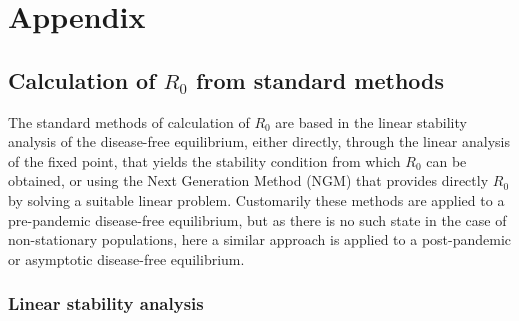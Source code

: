\section{Appendix}

\subsection{Calculation of $R_0$ from standard
    methods}\label{app:R0_standar_methods}

The standard methods of calculation of $R_0$ are based in the linear
stability analysis of the disease-free equilibrium, either directly, through
the linear analysis of the fixed point, that yields the stability condition
from which $R_0$ can be obtained, or using the Next Generation Method (NGM)
\cite{Diekmann2010} that provides directly $R_0$ by solving a suitable linear
problem. Customarily these methods are applied to a pre-pandemic disease-free
equilibrium, but as there is no such state in the case of non-stationary
populations, here a similar approach is applied to a post-pandemic or
asymptotic disease-free equilibrium.

\subsubsection*{Linear stability analysis}

